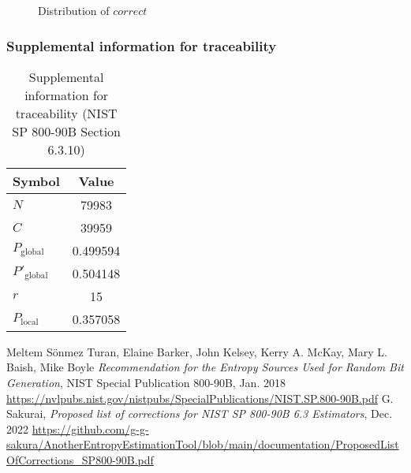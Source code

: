 \documentclass[a3paper,xelatex,english]{bxjsarticle}
\begin{document}
\begin{figure}[htbp]
\centering

\caption{Distribution of $correct$}
\end{figure}
\subsubsection{Supplemental information for traceability}
\renewcommand{\arraystretch}{1.8}
\begin{table}[h]
\caption{Supplemental information for traceability (NIST SP 800-90B Section 6.3.10)}
\begin{center}
\begin{tabular}{|l|c|}
\hline 
\rowcolor{anotherlightblue} %
Symbol				& Value \\ \hline 
$N$				& 79983\\ \hline 
$C$				& 39959\\ \hline 
$P_{\textrm{global}}$				& 0.499594\\ \hline 
$P'_{\textrm{global}}$			& 0.504148\\ \hline 
$r$				& 15\\ \hline 
$P_{\textrm{local}}$ 			& 0.357058\\ \hline
\end{tabular}
\end{center}
\end{table}
\renewcommand{\arraystretch}{1.4}
\begin{thebibliography}{99}
Meltem S\"{o}nmez Turan,
Elaine Barker,
John Kelsey,
Kerry A. McKay,
Mary L. Baish,
Mike Boyle
\textit{Recommendation for the Entropy Sources Used for Random Bit Generation},
NIST Special Publication 800-90B, Jan. 2018 
\url{https://nvlpubs.nist.gov/nistpubs/SpecialPublications/NIST.SP.800-90B.pdf}
G. Sakurai, \textit{Proposed list of corrections for NIST SP 800-90B 6.3 Estimators}, Dec. 2022 
\url{https://github.com/g-g-sakura/AnotherEntropyEstimationTool/blob/main/documentation/ProposedListOfCorrections_SP800-90B.pdf}
\end{thebibliography}
\end{document}
